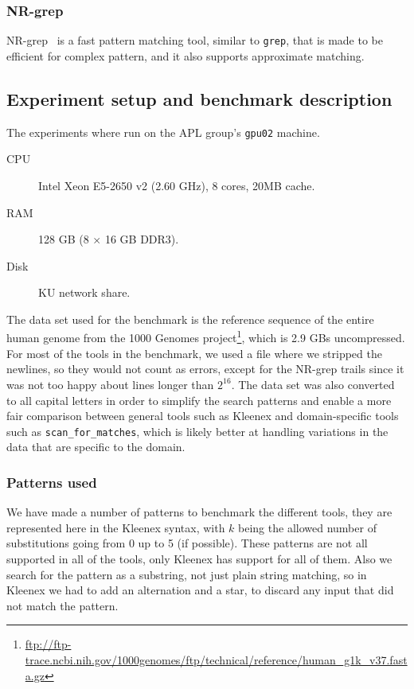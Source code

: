 \subsubsection{NR-grep}
NR-grep~\cite{navarro2001nr} is a fast pattern matching tool, similar to
\texttt{grep}, that is made to be efficient for complex pattern, and it also
supports approximate matching.

\subsection{Experiment setup and benchmark description}
The experiments where run on the APL group's \texttt{gpu02} machine.
\begin{description}
    \item[CPU] Intel Xeon E5-2650 v2 (2.60 GHz), 8 cores, 20MB cache.
    \item[RAM] 128 GB (8 $\times$ 16 GB DDR3).
    \item[Disk] KU network share.
\end{description}

The data set used for the benchmark is the reference sequence of the entire
human genome from the 1000 Genomes
project\footnote{\url{ftp://ftp-trace.ncbi.nih.gov/1000genomes/ftp/technical/reference/human_g1k_v37.fasta.gz}},
which is 2.9 GBs uncompressed. For most of the tools in the benchmark, we used
a file where we stripped the newlines, so they would not count as errors,
except for the NR-grep trails since it was not too happy about lines longer
than $2^{16}$. The data set was also converted to all capital letters in order
to simplify the search patterns and enable a more fair comparison between
general tools such as Kleenex and domain-specific tools such as
\texttt{scan\_for\_matches}, which is likely better at handling variations in
the data that are specific to the domain.

\subsubsection{Patterns used}
We have made a number of patterns to benchmark the different tools, they are
represented here in the Kleenex syntax, with $k$ being the allowed number of
substitutions going from 0 up to 5 (if possible). These patterns are not all
supported in all of the tools, only Kleenex has support for all of them. Also
we search for the pattern as a substring, not just plain string matching, so in
Kleenex we had to add an alternation and a star, to discard any input that did
not match the pattern.

